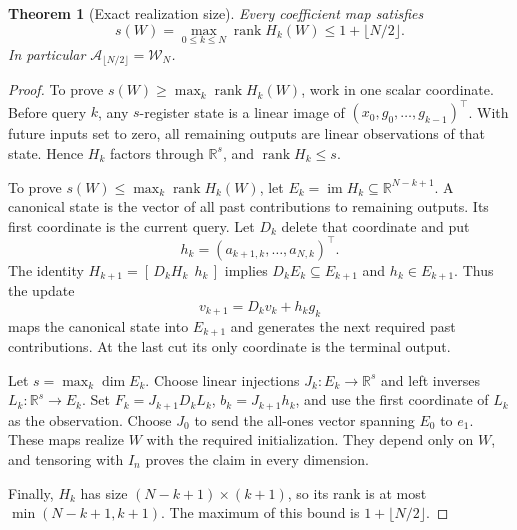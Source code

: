\documentclass[11pt]{article}
\numberwithin{equation}{section}
\newtheorem{theorem}{Theorem}[section]
\theoremstyle{definition}
\newcommand{\R}{\mathbb R}
\newcommand{\W}{\mathcal W_N}
\newcommand{\A}{\mathcal A}
\DeclareMathOperator{\rank}{rank}
\DeclareMathOperator{\im}{im}
\begin{document}
\begin{theorem}[Exact realization size]\label{thm:realization}
Every coefficient map satisfies
\begin{equation}
 s(W)=\max_{0\le k\le N}\rank H_k(W)
 \le 1+\lfloor N/2\rfloor.
 \label{eq:cut-rank}
\end{equation}
In particular $\A_{\lfloor N/2\rfloor}=\W$.
\end{theorem}
\begin{proof}
To prove $s(W)\ge\max_k\rank H_k(W)$, work in one scalar coordinate. Before query $k$, any $s$-register state is a linear image of $(x_0,g_0,\ldots,g_{k-1})^\top$. With future inputs set to zero, all remaining outputs are linear observations of that state. Hence $H_k$ factors through $\R^s$, and $\rank H_k\le s$.

To prove $s(W)\le\max_k\rank H_k(W)$, let $E_k=\im H_k\subseteq\R^{N-k+1}$. A canonical state is the vector of all past contributions to remaining outputs. Its first coordinate is the current query. Let $D_k$ delete that coordinate and put
\[
 h_k=(a_{k+1,k},\ldots,a_{N,k})^\top.
\]
The identity $H_{k+1}=[\,D_kH_k\ \ h_k\,]$ implies
$D_kE_k\subseteq E_{k+1}$ and $h_k\in E_{k+1}$. Thus the update
\[
 v_{k+1}=D_kv_k+h_kg_k
\]
maps the canonical state into $E_{k+1}$ and generates the next required past contributions. At the last cut its only coordinate is the terminal output.

Let $s=\max_k\dim E_k$. Choose linear injections $J_k:E_k\to\R^s$ and left inverses $L_k:\R^s\to E_k$. Set $F_k=J_{k+1}D_kL_k$, $b_k=J_{k+1}h_k$, and use the first coordinate of $L_k$ as the observation. Choose $J_0$ to send the all-ones vector spanning $E_0$ to $e_1$. These maps realize $W$ with the required initialization. They depend only on $W$, and tensoring with $I_n$ proves the claim in every dimension.

Finally, $H_k$ has size $(N-k+1)\times(k+1)$, so its rank is at most $\min(N-k+1,k+1)$. The maximum of this bound is $1+\lfloor N/2\rfloor$.
\end{proof}
\end{document}
